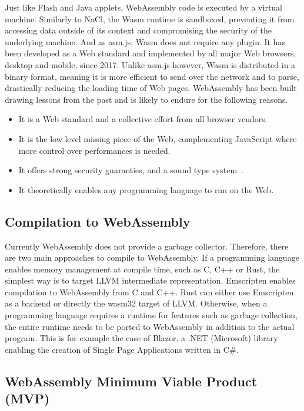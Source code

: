 Just like Flash and Java applets, WebAssembly code
is executed by a virtual machine.
Similarly to NaCl, the Wasm runtime is sandboxed,
preventing it from accessing data outside of its context
and compromising the security of the underlying machine.
And as asm.js, Wasm does not require any plugin.
It has been developed as a Web standard and implemented
by all major Web browsers, desktop and mobile, since 2017.
Unlike asm.js however, Wasm is distributed in a binary format,
meaning it is more efficient to send over the network and to parse,
drastically reducing the loading time of Web pages.
WebAssembly has been built drawing lessons from the past and is likely to endure
for the following reasons.

\begin{itemize}
	\item It is a Web standard and a collective effort from all browser vendors.
	\item It is the low level missing piece of the Web,
		complementing JavaScript where more control over performances is needed.
	\item It offers strong security guaranties, and a sound type system~\cite{watt2018mechanising}.
	\item It theoretically enables any programming language to run on the Web.
\end{itemize}

\subsection{Compilation to WebAssembly}%
\label{sub:compile-wasm}

Currently WebAssembly does not provide a garbage collector.
Therefore, there are two main approaches to compile to WebAssembly.
If a programming language enables memory management at compile time,
such as C, C++ or Rust, the simplest way is to target LLVM intermediate representation.
Emscripten enables compilation to WebAssembly from C and C++.
Rust can either use Emscripten as a backend or directly the wasm32 target of LLVM.\@
Otherwise, when a programming language requires a runtime for features such as garbage collection,
the entire runtime needs to be ported to WebAssembly in addition to the actual program.
This is for example the case of Blazor, a .NET (Microsoft) library
enabling the creation of Single Page Applications written in C\#.

\subsection{WebAssembly Minimum Viable Product (MVP)}%
\label{sub:wasm-mvp}

